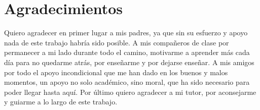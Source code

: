 

\chapter{Agradecimientos}

Quiero agradecer en primer lugar a mis padres, ya que sin su esfuerzo y apoyo nada de este trabajo habría sido posible. A mis compañeros de clase por permanecer a mi lado durante todo el camino, motivarme a aprender más cada día para no quedarme atrás, por enseñarme y por dejarse enseñar. A mis amigos por todo el apoyo incondicional que me han dado en los buenos y malos momentos, un apoyo no solo académico, sino moral, que ha sido necesario para poder llegar hasta aquí. Por último quiero agradecer a mi tutor, por aconsejarme y guiarme a lo largo de este trabajo.

\cleardoublepage
\endinput
